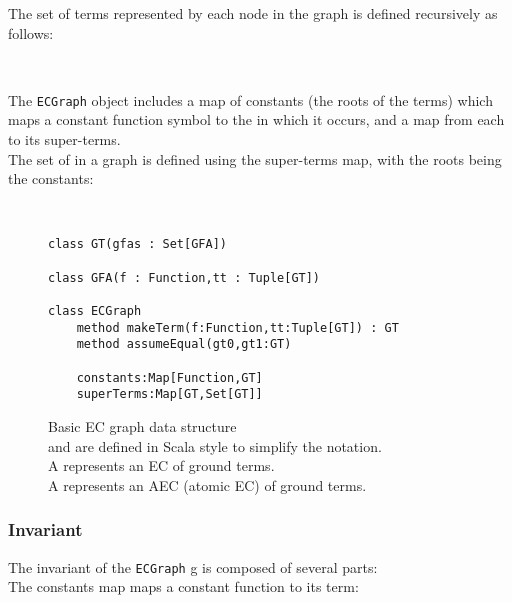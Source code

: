 \noindent
The set of terms represented by each node in the graph is defined recursively as follows:

\smallskip

\noindent
{}\\

\noindent
The \lstinline|ECGraph| object includes a map of constants (the roots of the terms) which maps a constant function symbol to the \GT{} in which it occurs, and a map from each \GT{} to its super-terms.\\
The set of \GTs{} in a graph is defined using the super-terms map, with the roots being the constants:

\smallskip

\noindent
{}\\

\bigskip

\begin{figure}
\begin{lstlisting}
class GT(gfas : Set[GFA])
	
class GFA(f : Function,tt : Tuple[GT])

class ECGraph
	method makeTerm(f:Function,tt:Tuple[GT]) : GT
	method assumeEqual(gt0,gt1:GT)

	constants:Map[Function,GT]
	superTerms:Map[GT,Set[GT]]
\end{lstlisting}
\caption{Basic EC graph data structure\\
\GTs{} and \GFAs{} are defined in Scala style to simplify the notation.\\
A \GT{} represents an EC of ground terms.\\
A \GFA{} represents an AEC (atomic EC) of ground terms.\\
}
\label{fig_basic_ECGraph}
\end{figure}

\subsubsection*{Invariant}
The invariant of the \lstinline|ECGraph| g is composed of several parts:\\
The constants map maps a constant function to its term:\\


